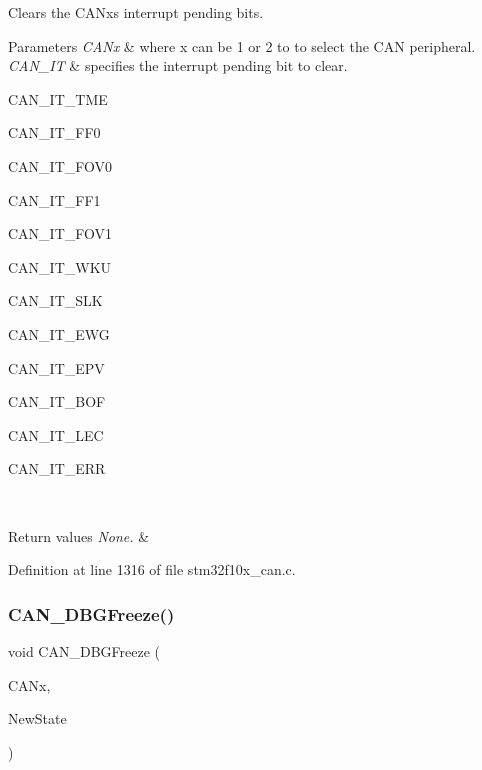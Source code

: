Clears the C\+A\+Nx\textquotesingle{}s interrupt pending bits. 


\begin{DoxyParams}{Parameters}
{\em C\+A\+Nx} & where x can be 1 or 2 to to select the C\+AN peripheral. \\
\hline
{\em C\+A\+N\+\_\+\+IT} & specifies the interrupt pending bit to clear.
\begin{DoxyItemize}
\item C\+A\+N\+\_\+\+I\+T\+\_\+\+T\+ME
\item C\+A\+N\+\_\+\+I\+T\+\_\+\+F\+F0
\item C\+A\+N\+\_\+\+I\+T\+\_\+\+F\+O\+V0
\item C\+A\+N\+\_\+\+I\+T\+\_\+\+F\+F1
\item C\+A\+N\+\_\+\+I\+T\+\_\+\+F\+O\+V1
\item C\+A\+N\+\_\+\+I\+T\+\_\+\+W\+KU
\item C\+A\+N\+\_\+\+I\+T\+\_\+\+S\+LK
\item C\+A\+N\+\_\+\+I\+T\+\_\+\+E\+WG
\item C\+A\+N\+\_\+\+I\+T\+\_\+\+E\+PV
\item C\+A\+N\+\_\+\+I\+T\+\_\+\+B\+OF
\item C\+A\+N\+\_\+\+I\+T\+\_\+\+L\+EC
\item C\+A\+N\+\_\+\+I\+T\+\_\+\+E\+RR 
\end{DoxyItemize}\\
\hline
\end{DoxyParams}

\begin{DoxyRetVals}{Return values}
{\em None.} & \\
\hline
\end{DoxyRetVals}


Definition at line 1316 of file stm32f10x\+\_\+can.\+c.

\mbox{\label{group___c_a_n___private___functions_gac0e2d33e08caf49d1f1251f0dcc20213}} 
\subsubsection{\texorpdfstring{C\+A\+N\+\_\+\+D\+B\+G\+Freeze()}{CAN\_DBGFreeze()}}
{\footnotesize\ttfamily void C\+A\+N\+\_\+\+D\+B\+G\+Freeze (\begin{DoxyParamCaption}\item[{\hyperlink{struct_c_a_n___type_def}{C\+A\+N\+\_\+\+Type\+Def} $\ast$}]{C\+A\+Nx,  }\item[{\hyperlink{group___exported__types_gac9a7e9a35d2513ec15c3b537aaa4fba1}{Functional\+State}}]{New\+State }\end{DoxyParamCaption})}



